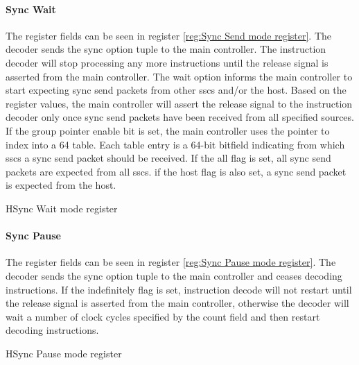 \paragraph{Sync Wait}

The register fields can be seen in register \ref{reg:Sync Send mode register}.
The decoder sends the sync option tuple to the main controller.
The instruction decoder will stop processing any more instructions until the release signal is asserted from the main controller.
The wait option informs the main controller to start expecting sync send packets from other \acp{ssc} and/or the host.
Based on the register values, the main controller will assert the release signal to the instruction decoder only once sync send packets have been received from all specified sources.
If the group pointer enable bit is set, the main controller uses the pointer to index into a 64 table. 
Each table entry is a 64-bit bitfield indicating from which \acp{ssc} a sync send packet should be received.
If the all flag is set, all sync send packets are expected from all \acp{ssc}.
if the host flag is also set, a sync send packet is expected from the host.
\begin{register}{H}{Sync Wait mode register}{}%
  \label{reg:Sync Wait mode register}
  \vspace{-20pt}
\end{register}


\paragraph{Sync Pause}

The register fields can be seen in register \ref{reg:Sync Pause mode register}.
The decoder sends the sync option tuple to the main controller and ceases decoding instructions.
If the indefinitely flag is set, instruction decode will not restart until the release signal is asserted from the main controller, otherwise the decoder will wait a number of clock cycles specified by the count field and then restart decoding instructions.
\begin{register}{H}{Sync Pause mode register}{}%
  \label{reg:Sync Pause mode register}
  \vspace{-10pt}
\end{register}

